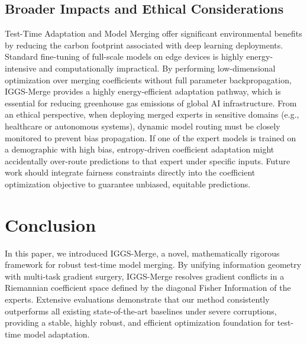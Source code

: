 \documentclass{article}
\theoremstyle{plain}
\theoremstyle{definition}
\theoremstyle{remark}
\begin{document}
\subsection{Broader Impacts and Ethical Considerations}
Test-Time Adaptation and Model Merging offer significant environmental benefits by reducing the carbon footprint associated with deep learning deployments. Standard fine-tuning of full-scale models on edge devices is highly energy-intensive and computationally impractical. By performing low-dimensional optimization over merging coefficients without full parameter backpropagation, IGGS-Merge provides a highly energy-efficient adaptation pathway, which is essential for reducing greenhouse gas emissions of global AI infrastructure.
From an ethical perspective, when deploying merged experts in sensitive domains (e.g., healthcare or autonomous systems), dynamic model routing must be closely monitored to prevent bias propagation. If one of the expert models is trained on a demographic with high bias, entropy-driven coefficient adaptation might accidentally over-route predictions to that expert under specific inputs. Future work should integrate fairness constraints directly into the coefficient optimization objective to guarantee unbiased, equitable predictions.

\section{Conclusion}
In this paper, we introduced IGGS-Merge, a novel, mathematically rigorous framework for robust test-time model merging. By unifying information geometry with multi-task gradient surgery, IGGS-Merge resolves gradient conflicts in a Riemannian coefficient space defined by the diagonal Fisher Information of the experts. Extensive evaluations demonstrate that our method consistently outperforms all existing state-of-the-art baselines under severe corruptions, providing a stable, highly robust, and efficient optimization foundation for test-time model adaptation.

\clearpage
\nocite{zeng2025robustmergeparameterefficient, zhang2023loraprunestructured, woo2025pacapartial, tian2025continualtesttime, goyal2022testtimeadaptation, aslam2024celcontinual, baysal2025overcomingclass, arnob2025exploringsparse, bioli2025acceleratingnatural, chuah2024revisitingentropy, donatella2024thermodynamicnatural, esmzad2025naturalgradient, gao2025promptawareadaptive, gomes2024adafisheradaptive, gomes2025towardspractical, he2025robustcrossscenario, huang2025drifttransferring, jhajj2025elasticweight, jiang2024pcottacontinual, k2024fishermask, kerssies2022evaluatingcontinual, kim2025battlingnonstationarity, kubota2025analysismodel, lu2024sppsparsitypreserved, lu2025beyondmean, ma2025disentanglesource, ma2025ebarefficient, moayedikia2025bridgingtraining, moskovitz2019firstorderpreconditioning, ni2025maintainingconsistent, rivera2025coloraefficient, sha2025investigationlifelong, shi2024controllablecontinual, sliogeris2025elasticweight, tseng2025incrementallearning, vejendla2025lattalangevinanchored, wang2022continualtesttime, xue2025enhancingopenworld, zeng2025parameterefficient, zhang2024dpcoredynamic, csn2024finetuningbert, csn2024multitasklearning, csn2024multitasktaskspecific}


\end{document}
